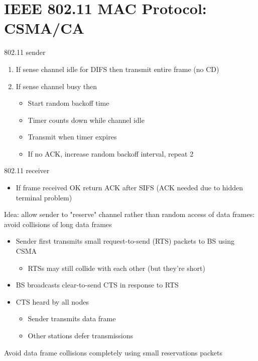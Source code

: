 \documentclass{article}[18pt]
\begin{document}
\section{IEEE 802.11 MAC Protocol: CSMA/CA}
802.11 sender
\begin{enumerate}
	\item If sense channel idle for DIFS then transmit entire frame (no CD)
	\item If sense channel busy then
	\begin{itemize}
		\item Start random backoff time
		\item Timer counts down while channel idle
		\item Transmit when timer expires
		\item If no ACK, increase random backoff interval, repeat 2
	\end{itemize}
\end{enumerate}
802.11 receiver
\begin{itemize}
	\item If frame received OK return ACK after SIFS (ACK needed due to hidden terminal problem)
\end{itemize}
Idea: allow sender to "reserve" channel rather than random access of data frames: avoid collisions of long data frames
\begin{itemize}
	\item Sender first transmits small request-to-send (RTS) packets to BS using CSMA
	\begin{itemize}
		\item RTSs may still collide with each other (but they're short)
	\end{itemize}
	\item BS broadcasts clear-to-send CTS in response to RTS
	\item CTS heard by all nodes
	\begin{itemize}
		\item Sender transmits data frame
		\item Other stations defer transmissions
	\end{itemize}
\end{itemize}
\begin{important}[Collisions]
Avoid data frame collisions completely using small reservations packets
\end{important}
\end{document}
